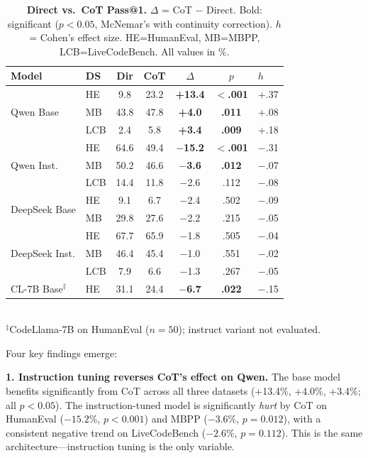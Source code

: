 \documentclass[11pt]{article}
\begin{document}
\begin{table}[t]
    \centering
    \caption{\textbf{Direct vs.\ CoT Pass@1.} $\Delta$ = CoT $-$ Direct. Bold: significant ($p < 0.05$, McNemar's with continuity correction). $h$ = Cohen's effect size. HE=HumanEval, MB=MBPP, LCB=LiveCodeBench. All values in \%.}
    \label{tab:generation}
    \small
    \begin{tabular}{llccccl}
        \toprule
        \textbf{Model} & \textbf{DS} & \textbf{Dir} & \textbf{CoT} & \textbf{$\Delta$} & \textbf{$p$} & \textbf{$h$} \\
        \midrule
        \multirow{3}{*}{Qwen Base}
        & HE & 9.8 & 23.2 & \textbf{+13.4} & \textbf{$<$.001} & $+$.37 \\
        & MB & 43.8 & 47.8 & \textbf{+4.0} & \textbf{.011} & $+$.08 \\
        & LCB & 2.4 & 5.8 & \textbf{+3.4} & \textbf{.009} & $+$.18 \\
        \midrule
        \multirow{3}{*}{Qwen Inst.}
        & HE & 64.6 & 49.4 & \textbf{$-$15.2} & \textbf{$<$.001} & $-$.31 \\
        & MB & 50.2 & 46.6 & \textbf{$-$3.6} & \textbf{.012} & $-$.07 \\
        & LCB & 14.4 & 11.8 & $-$2.6 & .112 & $-$.08 \\
        \midrule
        \multirow{2}{*}{DeepSeek Base}
        & HE & 9.1 & 6.7 & $-$2.4 & .502 & $-$.09 \\
        & MB & 29.8 & 27.6 & $-$2.2 & .215 & $-$.05 \\
        \midrule
        \multirow{3}{*}{DeepSeek Inst.}
        & HE & 67.7 & 65.9 & $-$1.8 & .505 & $-$.04 \\
        & MB & 46.4 & 45.4 & $-$1.0 & .551 & $-$.02 \\
        & LCB & 7.9 & 6.6 & $-$1.3 & .267 & $-$.05 \\
        \midrule
        CL-7B Base$^\ddagger$ & HE & 31.1 & 24.4 & \textbf{$-$6.7} & \textbf{.022} & $-$.15 \\
        \bottomrule
    \end{tabular}
    \vspace{1mm}\\
    \small $^\ddagger$CodeLlama-7B \citep{roziere2023code} on HumanEval ($n{=}50$); instruct variant not evaluated.
\end{table}

Four key findings emerge:

\textbf{1. Instruction tuning reverses CoT's effect on Qwen.} The base model benefits significantly from CoT across all three datasets (+13.4\%, +4.0\%, +3.4\%; all $p < 0.05$). The instruction-tuned model is significantly \emph{hurt} by CoT on HumanEval ($-15.2\%$, $p < 0.001$) and MBPP ($-3.6\%$, $p = 0.012$), with a consistent negative trend on LiveCodeBench ($-2.6\%$, $p = 0.112$). This is the same architecture---instruction tuning is the only variable.
\end{document}

